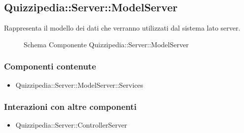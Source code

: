 \subsection{Quizzipedia::Server::ModelServer}
Rappresenta il modello dei dati che verranno utilizzati dal sistema lato server.
\begin{figure}[H]
\centering
\noindent{}
\caption[Quizzipedia::Server::ModelServer]{Schema Componente Quizzipedia::Server::ModelServer}
\end{figure}
\subsubsection{Componenti contenute}
\begin{itemize}
\item Quizzipedia::Server::ModelServer::Services
\end{itemize}
\subsubsection{Interazioni con altre componenti}
\begin{itemize}
\item Quizzipedia::Server::ControllerServer
\end{itemize}
